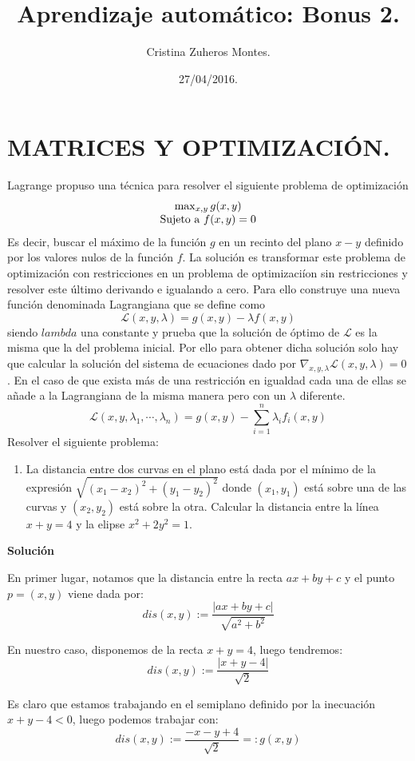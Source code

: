 \documentclass{article}
\title{Aprendizaje automático: Bonus 2.}
\author{Cristina Zuheros Montes.}
\date{27/04/2016.}
\begin{document}
\maketitle

\section{MATRICES Y OPTIMIZACIÓN.}
 Lagrange propuso una técnica para resolver el siguiente problema de optimización 
 \[
 \begin{array}{c}
 \max_{x,y} g(x,y) \\
 \hbox{Sujeto a } f(x,y)=0
 \end{array}
 \]
 Es decir, buscar el máximo de la función $g$ en un recinto del plano $x-y$ definido por los valores nulos de la función $f$. La solución es transformar este problema de optimización con restricciones en un problema de optimizaciíon sin restricciones y resolver este último derivando e igualando a cero. Para ello construye una nueva función denominada Lagrangiana que se define como
 \[
 \mathcal{L}(x,y,\lambda)=g(x,y)-\lambda f(x,y)
 \]
 siendo $lambda$ una constante y prueba que la solución de óptimo de $\mathcal{L}$ es la misma que la del problema inicial. Por ello para obtener dicha solución solo hay que calcular la solución del sistema de ecuaciones dado por $\nabla_{x,y,\lambda}\mathcal{L}(x,y,\lambda)=0$. En el caso de que exista más de una restricción en igualdad cada una de ellas se añade a la Lagrangiana de la misma manera pero con un $\lambda$ diferente.
 \[
 \mathcal{L}(x,y,\lambda_1,\cdots,\lambda_n)=g(x,y)-\sum_{i=1}^n\lambda_i f_i(x,y)
 \]
 Resolver el siguiente problema: 
     \begin{enumerate}
     	\item La distancia entre dos curvas en el plano está dada por el mínimo de la expresión $\sqrt{(x_1-x_2)^2+(y_1-y_2)^2}$ donde $(x_1,y_1)$ está sobre una de las curvas y $(x_2,y_2)$ está sobre la otra. Calcular la distancia entre la línea $x+y=4$ y la elipse $x^2+2y^2=1$.
     \end{enumerate}
     
 \textbf{Solución}
  
En primer lugar, notamos que la distancia entre la recta $ax+by+c$ y el punto $p=(x,y)$ viene dada por:
\[
dis(x,y):= \frac{|ax+by+c|}{\sqrt{a^{2}+b^{2}}}
\]

En nuestro caso, disponemos de la recta $x+y=4$, luego tendremos:
\[
dis(x,y):= \frac{|x+y-4|}{\sqrt{2}}
\]

Es claro que estamos trabajando en el semiplano definido por la inecuación $x+y-4<0$, luego podemos trabajar con:
 \[
 dis(x,y):= \frac{-x-y+4}{\sqrt{2}} =: g(x,y)
 \]
 
\end{document}
